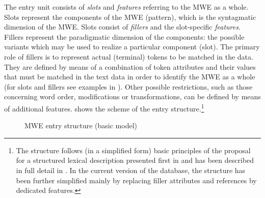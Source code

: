 \documentclass[output=paper,colorlinks,citecolor=brown]{langscibook}
\begin{document}
The entry unit consists of \textit{slots} and \textit{features} referring to the MWE as a whole. Slots represent the components of the MWE (pattern), which is the syntagmatic dimension of the MWE. Slots consist of \textit{fillers} and the slot-specific \textit{features}. Fillers represent the paradigmatic dimension of the components: the possible variants which may be used to realize a particular component (slot). The primary role of fillers is to represent actual (terminal) tokens to be matched in the data. They are defined by means of a combination of token attributes and their values that must be matched in the text data in order to identify the MWE as a whole (for slots and fillers see examples in ). Other possible restrictions, such as those concerning word order, modifications or transformations, can be defined by means of additional features.  shows the scheme of the entry structure.\footnote{The structure follows (in a simplified form) basic principles of the proposal for a structured lexical description presented first in \citet{Vondricka:2014} and has been described in full detail in \citet{Vondricka:2019}. In the current version of the database, the structure has been further simplified mainly by replacing filler attributes and references by dedicated features.}

\begin{figure}
 \centering
 \caption{MWE entry structure (basic model)}\label{fig:structure}
\end{figure}
\end{document}
